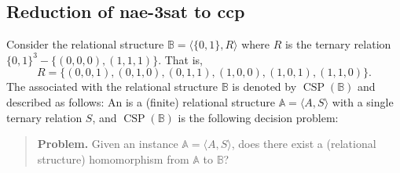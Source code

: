 \documentclass[12pt]{amsart}
\numberwithin{equation}{section}
\theoremstyle{plain}
\theoremstyle{definition}
\newcommand{\ccp}{\acs{ccp}\xspace}
\newcommand{\sat}{\acs{sat}\xspace}
\newcommand{\nae}{\acs{nae}\xspace}
\newcommand{\NP}{\acs{NP}\xspace}
\begin{document}



\subsection{Reduction of \nae-3\sat to \ccp}
Consider the relational structure $\mathbb B = \langle \{0, 1\}, R\rangle$
where $R$ is the ternary relation $\{0, 1\}^3 - \{(0,0,0), (1,1,1)\}$.
That is,
\[ R = \{(0,0,1), (0,1,0), (0,1,1), (1,0,0), (1,0,1), (1,1,0)\}.\]
The \csp associated with the relational structure $\mathbb B$
is denoted by $\operatorname{CSP}(\mathbb B)$ and described as follows:
An  %
is a (finite) relational structure $\mathbb A = \langle A, S \rangle$
with a single ternary relation $S$, and $\operatorname{CSP}(\mathbb B)$ is the
following decision problem:

\begin{quote}
{\bf Problem.} Given an instance $\mathbb A = \langle A, S \rangle$,
does there exist a (relational structure) homomorphism from $\mathbb A$ to $\mathbb B$?
\end{quote}
\end{document}
